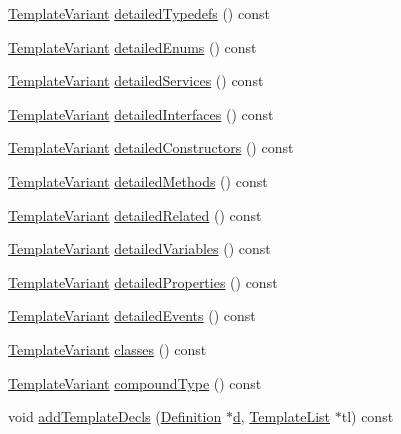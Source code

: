 \begin{DoxyCompactItemize}
\item 
\hyperlink{class_template_variant}{Template\+Variant} \hyperlink{class_class_context_1_1_private_aae31e941debd351a2188c569aefa597f}{detailed\+Typedefs} () const 
\item 
\hyperlink{class_template_variant}{Template\+Variant} \hyperlink{class_class_context_1_1_private_a075ee480d4c1ed87b8e44596ffcd2ecc}{detailed\+Enums} () const 
\item 
\hyperlink{class_template_variant}{Template\+Variant} \hyperlink{class_class_context_1_1_private_afebeb09418297a7a6a2783b28bb9420c}{detailed\+Services} () const 
\item 
\hyperlink{class_template_variant}{Template\+Variant} \hyperlink{class_class_context_1_1_private_ac26bde84ff4e7b98ab8139c1d46f616b}{detailed\+Interfaces} () const 
\item 
\hyperlink{class_template_variant}{Template\+Variant} \hyperlink{class_class_context_1_1_private_a98d880ed3931f38ef7a569bbd0f5a4c9}{detailed\+Constructors} () const 
\item 
\hyperlink{class_template_variant}{Template\+Variant} \hyperlink{class_class_context_1_1_private_a72056ffe815b0a83abe6eb3a153e7658}{detailed\+Methods} () const 
\item 
\hyperlink{class_template_variant}{Template\+Variant} \hyperlink{class_class_context_1_1_private_a32c2b67e0b7b1d9ae5ae922514ef9b8a}{detailed\+Related} () const 
\item 
\hyperlink{class_template_variant}{Template\+Variant} \hyperlink{class_class_context_1_1_private_a1c5332d59ec296c185441bb6deb15bd8}{detailed\+Variables} () const 
\item 
\hyperlink{class_template_variant}{Template\+Variant} \hyperlink{class_class_context_1_1_private_a1954bf91e347740a0f667c980d7f3d23}{detailed\+Properties} () const 
\item 
\hyperlink{class_template_variant}{Template\+Variant} \hyperlink{class_class_context_1_1_private_a4f7f4e1bdeaa40cd7a407472f065280f}{detailed\+Events} () const 
\item 
\hyperlink{class_template_variant}{Template\+Variant} \hyperlink{class_class_context_1_1_private_a7f90e1dc7f40bc027297b8dadde830ae}{classes} () const 
\item 
\hyperlink{class_template_variant}{Template\+Variant} \hyperlink{class_class_context_1_1_private_acd847cb75cf464c88426cca7798e54f8}{compound\+Type} () const 
\item 
void \hyperlink{class_class_context_1_1_private_a51843be1bc1b65ecd0898121495395b0}{add\+Template\+Decls} (\hyperlink{class_definition}{Definition} $\ast$\hyperlink{060__command__switch_8tcl_af43f4b1f0064a33b2d662af9f06d3a00}{d}, \hyperlink{class_template_list}{Template\+List} $\ast$tl) const 

\end{DoxyCompactItemize}
